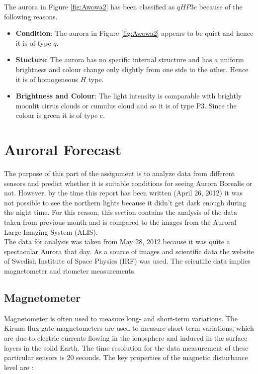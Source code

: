 \documentclass{article}
\begin{document}
The aurora in Figure \ref{fig:Awowa2} has been classified as $qHP3c$ because of the following reasons.

\begin{itemize}
\item \textbf{Condition}:  The aurora in Figure \ref{fig:Awowa2} appears to be quiet and hence it is of type $q$.
\item \textbf{Stucture}: The aurora has no specific internal structure and has a uniform brightness and colour change only slightly from one side to the other. Hence it is of homogeneous $H$ type.
\item \textbf{Brightness and Colour}: The light intensity is comparable with brightly moonlit cirrus clouds or cumulus cloud and so it is of type P3. Since the colour is green it is of type c.
\end{itemize}


\section{Auroral Forecast}

The purpose of this part of the assignment is to analyze data from different sensors and predict whether it is suitable conditions for seeing Aurora Borealis or not. However, by the time this report has been written (April 26, 2012) it was not possible to see the northern lights because it didn't get dark enough during the night time. For this reason, this section contains the analysis of the data taken from previous month and is compared to the images from the Auroral Large Imaging System (ALIS).
\\
The data for analysis was taken from May 28, 2012 because it was quite a spectacular Aurora that day. As a source of images and scientific data the website of Swedish Institute of Space Physics (IRF) was used. The scientific data implies magnetometer and riometer measurements.

\subsection{Magnetometer}
Magnetometer is often used to measure long- and short-term variations. The Kiruna flux-gate magnetometers are used to measure short-term variations, which are due to electric currents flowing in the ionosphere and induced in the surface layers in the solid Earth. The time resolution for the data measurement of these particular sensors is 20 seconds. The key properties of the magnetic disturbance level are \cite{KivelsonRussell:1996isp}:
\end{document}
